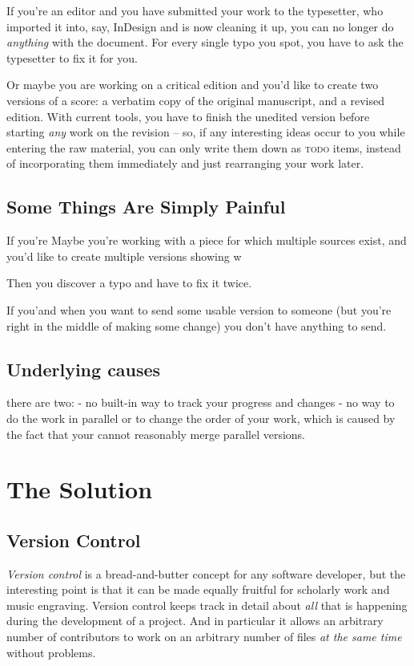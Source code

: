 \documentclass[11pt,a4paper]{article}
\begin{document}
If you're an editor and you have submitted your work to the typesetter, who imported it
into, say, InDesign and is now cleaning it up, you can no longer do \emph{anything} with
the document.  For every single typo you spot, you have to ask the typesetter to fix it
for you.

Or maybe you are working on a critical edition and you'd like to create two versions
of a score: a verbatim copy of the original manuscript, and a revised edition.
With current tools, you have to finish the unedited version before starting
\emph{any} work on the revision -- so, if any interesting ideas occur to you
while entering the raw material, you can only write them down as \textsc{todo}
items, instead of incorporating them immediately and just rearranging your work later.

\subsection{Some Things Are Simply Painful}
If you're Maybe you're working with a piece for which multiple sources exist,
and you'd like to create multiple versions showing w

Then you discover a typo and have to fix it twice.


If you'and when you want to send some usable version to someone
(but you're right in the middle of making some change)
you don't have anything to send.

\subsection{Underlying causes}
there are two:
- no built-in way to track your progress and changes
- no way to do the work in parallel or to change the order of your work, 
which is caused by the fact that your cannot reasonably merge parallel versions.


\section{The Solution}

\subsection{Version Control}
\emph{Version control} is a bread-and-butter concept for any software developer, but the
interesting point is that it can be made equally fruitful for scholarly work and music
engraving. Version control keeps track in detail about \emph{all} that is happening during
the development of a project. And in particular it allows an arbitrary number of contributors
to work on an arbitrary number of files \emph{at the same time} without problems.
\end{document}
